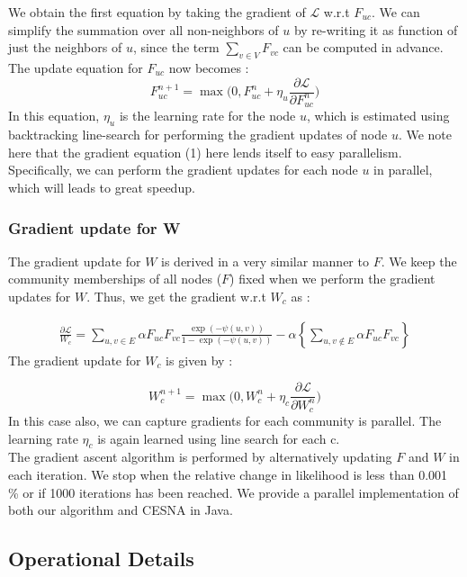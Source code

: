 \documentclass[11pt]{article}
\begin{document}
We obtain the first equation by taking the gradient of $\mathcal{L}$ w.r.t $F_{uc}$. We can simplify the summation over all non-neighbors of $u$ by re-writing it as function of just the neighbors of $u$, since the term $\sum\limits_{v \in V} F_{vc}$ can be computed in advance. The update equation for $F_{uc}$ now becomes : 
\begin{equation} \label{gradf}
 F_{uc}^{n+1} =  \max \Big(0, F_{uc}^n  + \eta_u \frac{\partial \mathcal{L}}{\partial F_{uc}^n}\Big) 
\end{equation}
In this equation, $\eta_{u}$ is the learning rate for the node $u$, which is estimated using backtracking line-search \cite{boyd} for performing the gradient updates of node $u$. We note here that the gradient equation (1) here lends itself to easy parallelism. Specifically, we can perform the gradient updates for each node $u$ in parallel, which will leads to great speedup. 
\subsubsection*{Gradient update for W}
The gradient update for $W$ is derived in a very similar manner to $F$. We keep the community memberships of all nodes ($F$) fixed when we perform the gradient updates for $W$. Thus, we get the gradient w.r.t $W_c$ as : 

\begin{align*}
\frac{\partial \mathcal{L}}{W_{c}}  = \sum\limits_{u,v \in E}  \alpha F_{uc} F_{vc} \frac{\exp(- \psi(u,v))}{1 - \exp(-\psi(u,v))} -  \alpha \left\lbrace \sum\limits_{u, v \notin E} \alpha F_{uc} F_{vc} \right\rbrace
\end{align*}
The gradient update for $W_c$ is given by : 

\begin{equation} \label{gradw}
W_{c}^{n+1} =  \max \Big(0, W_{c}^n  + \eta_c \frac{\partial \mathcal{L}}{\partial W_{c}^n}\Big) 
\end{equation}
In this case also, we can capture gradients  for each community is parallel.  The learning rate $\eta_c$ is again learned using line search for each c. \\[3pt]
The gradient ascent algorithm is performed by alternatively updating $F$ and $W$ in each iteration.  We stop when the relative change in likelihood is less than 0.001 \% or if 1000 iterations has been reached. We provide a parallel implementation of both our algorithm and CESNA in Java. 

\subsection{Operational Details}
\end{document}
